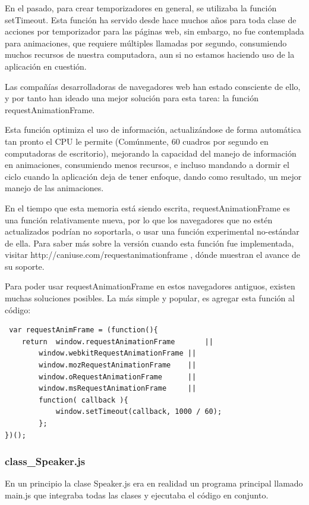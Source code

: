 En el pasado, para crear temporizadores en general, se utilizaba la función setTimeout. Esta función ha servido desde hace muchos años para toda clase de acciones por temporizador para las páginas web, sin embargo, no fue contemplada para animaciones, que requiere múltiples llamadas por segundo, consumiendo muchos recursos de nuestra computadora, aun si no estamos haciendo uso de la aplicación en cuestión.

Las compañías desarrolladoras de navegadores web han estado consciente de ello, y por tanto han ideado una mejor solución para esta tarea: la función requestAnimationFrame.

Esta función optimiza el uso de información, actualizándose de forma automática tan pronto el CPU le permite (Comúnmente, 60 cuadros por segundo en computadoras de escritorio), mejorando la capacidad del manejo de información en animaciones, consumiendo menos recursos, e incluso mandando a dormir el ciclo cuando la aplicación deja de tener enfoque, dando como resultado, un mejor manejo de las animaciones.

En el tiempo que esta memoria está siendo escrita, requestAnimationFrame es una función relativamente nueva, por lo que los navegadores que no estén actualizados podrían no soportarla, o usar una función experimental no-estándar de ella. Para saber más sobre la versión cuando esta función fue implementada, visitar http://caniuse.com/requestanimationframe , dónde muestran el avance de su soporte.

Para poder usar requestAnimationFrame en estos navegadores antiguos, existen muchas soluciones posibles. La más simple y popular, es agregar esta función al código:

\begin{verbatim}
 var requestAnimFrame = (function(){
    return  window.requestAnimationFrame       ||
        window.webkitRequestAnimationFrame ||
        window.mozRequestAnimationFrame    ||
        window.oRequestAnimationFrame      ||
        window.msRequestAnimationFrame     ||
        function( callback ){
            window.setTimeout(callback, 1000 / 60);
        };
})();
\end{verbatim}

\subsubsection{class\_Speaker.js}
\label{sec:speaker_ivan}
En un principio la clase Speaker.js era en realidad un programa principal llamado main.js que integraba todas las clases y ejecutaba el código en conjunto.

